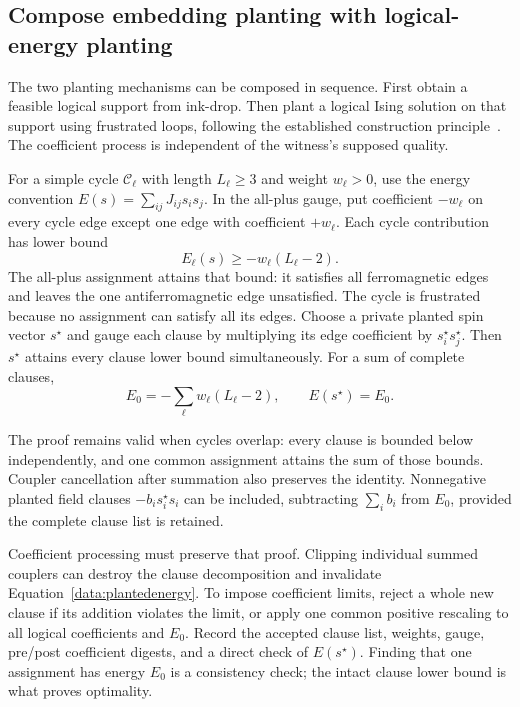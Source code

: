 \subsection{Compose embedding planting with logical-energy planting}
\label{data:frustrated}

The two planting mechanisms can be composed in sequence. First obtain a feasible logical support from ink-drop. Then plant a logical Ising solution on that support using frustrated loops, following the established construction principle~\cite{hen2015}. The coefficient process is independent of the witness's supposed quality.

For a simple cycle $\mathcal C_\ell$ with length $L_\ell\ge3$ and weight $w_\ell>0$, use the energy convention $E(s)=\sum_{ij}J_{ij}s_is_j$. In the all-plus gauge, put coefficient $-w_\ell$ on every cycle edge except one edge with coefficient $+w_\ell$. Each cycle contribution has lower bound
\[
 E_\ell(s)\ge-w_\ell(L_\ell-2).
\]
The all-plus assignment attains that bound: it satisfies all ferromagnetic edges and leaves the one antiferromagnetic edge unsatisfied. The cycle is frustrated because no assignment can satisfy all its edges. Choose a private planted spin vector $s^\star$ and gauge each clause by multiplying its edge coefficient by $s_i^\star s_j^\star$. Then $s^\star$ attains every clause lower bound simultaneously. For a sum of complete clauses,
\begin{equation}
 E_0=-\sum_\ell w_\ell(L_\ell-2),
 \qquad E(s^\star)=E_0.
 \label{data:plantedenergy}
\end{equation}

The proof remains valid when cycles overlap: every clause is bounded below independently, and one common assignment attains the sum of those bounds. Coupler cancellation after summation also preserves the identity. Nonnegative planted field clauses $-b_i s_i^\star s_i$ can be included, subtracting $\sum_i b_i$ from $E_0$, provided the complete clause list is retained.

Coefficient processing must preserve that proof. Clipping individual summed couplers can destroy the clause decomposition and invalidate Equation~\eqref{data:plantedenergy}. To impose coefficient limits, reject a whole new clause if its addition violates the limit, or apply one common positive rescaling to all logical coefficients and $E_0$. Record the accepted clause list, weights, gauge, pre/post coefficient digests, and a direct check of $E(s^\star)$. Finding that one assignment has energy $E_0$ is a consistency check; the intact clause lower bound is what proves optimality.

